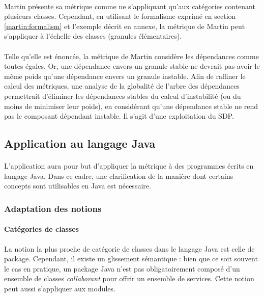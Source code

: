 \documentclass{scrartcl}
\begin{document}
    \paragraph{}Martin présente sa métrique comme ne s'appliquant qu'aux catégories contenant plusieurs classes. Cependant, en utilisant le formalisme exprimé en section \ref{martin:formalism} et l'exemple décrit en annexe, la métrique de Martin peut s'appliquer à l'échelle des classes (granules élémentaires).
    
    \paragraph{}Telle qu'elle est énoncée, la métrique de Martin considère les dépendances comme toutes égales. Or, une dépendance envers un granule stable ne devrait pas avoir le même poids qu'une dépendance envers un granule instable. Afin de raffiner le calcul des métriques, une analyse de la globalité de l'arbre des dépendances permettrait d'éliminer les dépendances stables du calcul d'instabilité (ou du moins de minimiser leur poids), en considérant qu'une dépendance stable ne rend pas le composant dépendant instable. Il s'agit d'une exploitation du SDP.


\subsection{Application au langage Java}

    \paragraph{}L'application aura pour but d'appliquer la métrique à des programmes écrits en langage Java. Dans ce cadre, une clarification de la manière dont certains concepts sont utilisables en Java est nécessaire.

\subsubsection{Adaptation des notions}

    \paragraph{Catégories de classes}La notion la plus proche de catégorie de classes dans le langage Java est celle de package. Cependant, il existe un glissement sémantique : bien que ce soit souvent le cas en pratique, un package Java n'est pas obligatoirement composé d'un ensemble de classes \emph{collaborant} pour offrir un ensemble de services. Cette notion peut aussi s'appliquer aux modules.
\end{document}
